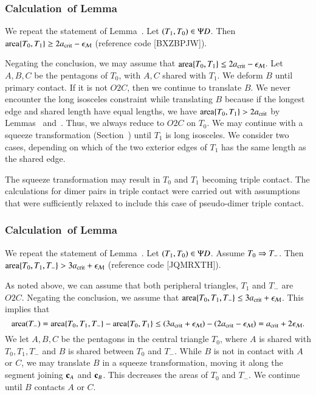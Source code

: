 \subsubsection{Calculation~of Lemma~} 

We repeat the statement of Lemma~.
Let $(T_1,T_0)\in\Psi D$.  Then ${\operatorname{area}}\{T_0,T_1\} \ge 2a_\text{crit} - \epsilon_{\mathcal M}$
(reference code [BXZBPJW]).

Negating the conclusion, we may assume that ${\operatorname{area}}\{T_0,T_1\}\le
2a_\text{crit} - \epsilon_{\mathcal M}$.  Let $A,B,C$ be the pentagons of $T_0$, with $A,C$
shared with $T_1$.  We deform $B$ until primary contact.  If it is not
$O2C$, then we continue to translate $B$.  We never encounter the long
isosceles constraint while translating $B$ because if the longest edge
and shared length have equal lengths, we have ${\operatorname{area}}\{T_0,T_1\} >
2a_\text{crit}$ by Lemmas~ and~.  Thus,
we always reduce to $O2C$ on $T_0$.  We may continue with a squeeze
transformation (Section~) until $T_1$ is long
isosceles.  We consider two cases, depending on which of the two
exterior edges of $T_1$ has the same length as the shared edge.

The squeeze transformation may result in $T_0$ and $T_1$ becoming
triple contact.  The calculations for dimer pairs in triple contact
were carried out with assumptions that were sufficiently relaxed to
include this case of pseudo-dimer triple contact.

\subsubsection{Calculation~of Lemma~}

We repeat the statement of Lemma~.  Let
$(T_1,T_0)\in\Psi D$. Assume $T_0\Rightarrow T_-$.  Then ${\operatorname{area}}\{T_0,T_1,T_-\} >
3a_\text{crit} + \epsilon_{\mathcal M}$ (reference code [JQMRXTH]).

As noted above, we can assume that both peripheral triangles, $T_1$
and $T_-$ are $O2C$.  Negating the conclusion, we assume that
${\operatorname{area}}\{T_0,T_1,T_-\}\le 3a_\text{crit}+\epsilon_{\mathcal M}$.  This implies that
\[
{\operatorname{area}}(T_-) = {\operatorname{area}}\{T_0,T_1,T_-\} - {\operatorname{area}}\{T_0,T_1\} 
\le (3a_\text{crit}+\epsilon_{\mathcal M}) - (2a_\text{crit} - \epsilon_{\mathcal M}) = a_\text{crit} + 2\epsilon_{\mathcal M}.
\]
We let $A,B,C$ be the pentagons in the central triangle $T_0$, where
$A$ is shared with $T_0,T_1,T_-$ and $B$ is shared between $T_0$ and
$T_-$.  While $B$ is not in contact with $A$ or $C$, we may translate
$B$ in a squeeze transformation, moving it along the segment joining
${\mathbf c}_A$ and ${\mathbf c}_B$.  This decreases the areas of $T_0$ and $T_-$.  We
continue until $B$ contacts $A$ or $C$.

